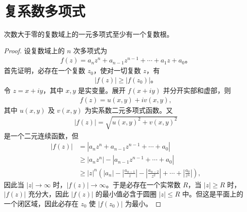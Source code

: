 \documentclass[../../main.tex]{subfiles}
\begin{document}
\section{复系数多项式}

\begin{theorem}[代数基本定理]\label{theorem:代数基本定理}
次数大于零的复数域上的一元多项式至少有一个复数根。
\end{theorem}
\begin{proof}
设复数域上的 $n$ 次多项式为
\begin{align}
f(z) = a_n z^n + a_{n-1} z^{n-1} + \cdots + a_1 z + a_0。 \label{theorem5.14-5.6.1}
\end{align}
首先证明，必存在一个复数 $z_0$，使对一切复数 $z$，有
\begin{align*}
|f(z)| \geq |f(z_0)|。
\end{align*}
令 $z = x + iy$，其中 $x, y$ 是实变量。展开 $f(x + iy)$ 并分开实部和虚部，则
\begin{align*}
f(z) = u(x, y) + iv(x, y),
\end{align*}
其中 $u(x, y)$ 及 $v(x, y)$ 为实系数二元多项式函数。又
\begin{align*}
|f(z)| = \sqrt{u(x, y)^2 + v(x, y)^2}
\end{align*}
是一个二元连续函数，但
\begin{align*}
|f(z)| &= |a_n z^n + a_{n-1} z^{n-1} + \cdots + a_0| \\
&\geq |a_n z^n| - |a_{n-1} z^{n-1} + \cdots + a_0| \\
&\geq |z|^n \left( |a_n| - \left| \frac{a_{n-1}}{z} \right| - \left| \frac{a_{n-2}}{z^2} \right| + \cdots + \left| \frac{a_0}{z^n} \right| \right),
\end{align*}
因此当 $|z| \to \infty$ 时，$|f(z)| \to \infty$。于是必存在一个实常数 $R$，当 $|z| \geq R$ 时，$|f(z)|$ 充分大，因此 $|f(z)|$ 的最小值必含于圆圈 $|z| \leq R$ 中。但这是平面上的一个闭区域，因此必存在 $z_0$ 使 $|f(z_0)|$ 为最小。


\end{proof}
\end{document}
